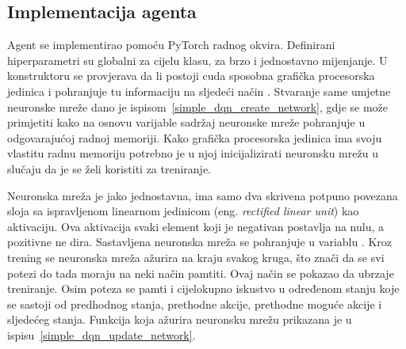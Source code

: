 \subsection{Implementacija agenta}
Agent se implementirao pomoću PyTorch radnog okvira. Definirani hiperparametri su globalni za cijelu klasu, za brzo i jednostavno mijenjanje. U konstruktoru se provjerava da li postoji cuda sposobna grafička procesorska jedinica i pohranjuje tu informaciju na sljedeći način . Stvaranje same umjetne neuronske mreže dano je ispisom~\ref{simple_dqn_create_network}, gdje se može primjetiti kako na osnovu varijable  sadržaj neuronske mreže pohranjuje u odgovarajućoj radnoj memoriji. Kako grafička procesorska jedinica ima svoju vlastitu radnu memoriju potrebno je u njoj inicijalizirati neuronsku mrežu u slučaju da je se želi koristiti za treniranje.


Neuronska mreža je jako jednostavna, ima samo dva skrivena potpuno povezana sloja sa ispravljenom linearnom jedinicom (eng. \textit{rectified linear unit}) kao aktivaciju. Ova aktivacija svaki element koji je negativan postavlja na nulu, a pozitivne ne dira. Sastavljena neuronska mreža se pohranjuje u variablu . Kroz trening se neuronska mreža ažurira na kraju svakog kruga, što znači da se svi potezi do tada moraju na neki način pamtiti. Ovaj način se pokazao da ubrzaje treniranje. Osim poteza se pamti i cijelokupno iskustvo u određenom stanju koje se sastoji od predhodnog stanja, prethodne akcije, prethodne moguće akcije i sljedećeg stanja. Funkcija koja ažurira neuronsku mrežu prikazana je u ispisu~\ref{simple_dqn_update_network}.



